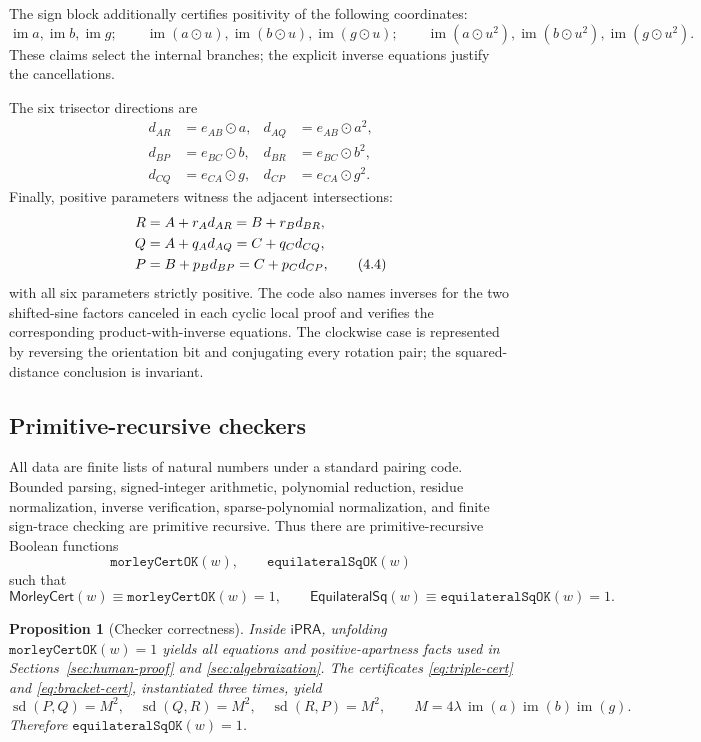\documentclass[11pt]{article}
\newtheorem{proposition}[theorem]{Proposition}
\theoremstyle{definition}
\newcommand{\iPRA}{\mathsf{iPRA}}
\newcommand{\Cert}{\mathsf{MorleyCert}}
\newcommand{\EqSq}{\mathsf{EquilateralSq}}
\newcommand{\rotmul}{\mathbin{\odot}}
\newcommand{\sqdist}{\operatorname{sd}}
\newcommand{\im}{\operatorname{im}}
\newcommand{\code}[1]{\texttt{#1}}
\begin{document}
The sign block additionally certifies positivity of the following coordinates:
\[
 \im a,\im b,\im g;\qquad
 \im(a\rotmul u),\im(b\rotmul u),\im(g\rotmul u);\qquad
 \im(a\rotmul u^2),\im(b\rotmul u^2),\im(g\rotmul u^2).
\]
These claims select the internal branches; the explicit inverse equations
justify the cancellations.

The six trisector directions are
\begin{align*}
 d_{AR}&=e_{AB}\rotmul a,& d_{AQ}&=e_{AB}\rotmul a^2,\\
 d_{BP}&=e_{BC}\rotmul b,& d_{BR}&=e_{BC}\rotmul b^2,\\
 d_{CQ}&=e_{CA}\rotmul g,& d_{CP}&=e_{CA}\rotmul g^2.
\end{align*}
Finally, positive parameters witness the adjacent intersections:
\begin{align}
 R&=A+r_A d_{AR}=B+r_B d_{BR},\notag\\
 Q&=A+q_A d_{AQ}=C+q_C d_{CQ},\notag\\
 P&=B+p_B d_{BP}=C+p_C d_{CP},
 \tag{4.4}\label{eq:intersections}
\end{align}
with all six parameters strictly positive.  The code also names inverses for
the two shifted-sine factors canceled in each cyclic local proof and verifies
the corresponding product-with-inverse equations.  The clockwise case is
represented by reversing the orientation bit and conjugating every rotation
pair; the squared-distance conclusion is invariant.

\subsection{Primitive-recursive checkers}
All data are finite lists of natural numbers under a standard pairing code.
Bounded parsing, signed-integer arithmetic, polynomial reduction, residue
normalization, inverse verification, sparse-polynomial normalization, and
finite sign-trace checking are primitive recursive.  Thus there are
primitive-recursive Boolean functions
\[
  \code{morleyCertOK}(w),\qquad \code{equilateralSqOK}(w)
\]
such that
\[
 \Cert(w)\equiv\code{morleyCertOK}(w)=1,
 \qquad
 \EqSq(w)\equiv\code{equilateralSqOK}(w)=1.
\]

\begin{proposition}[Checker correctness]
Inside $\iPRA$, unfolding $\code{morleyCertOK}(w)=1$ yields all equations and
positive-apartness facts used in Sections~\ref{sec:human-proof} and
\ref{sec:algebraization}.  The certificates
\eqref{eq:triple-cert} and \eqref{eq:bracket-cert}, instantiated three times,
yield
\[
 \sqdist(P,Q)=M^2,
 \quad \sqdist(Q,R)=M^2,
 \quad \sqdist(R,P)=M^2,
 \qquad M=4\lambda\,\im(a)\im(b)\im(g).
\]
Therefore $\code{equilateralSqOK}(w)=1$.
\end{proposition}
\end{document}
